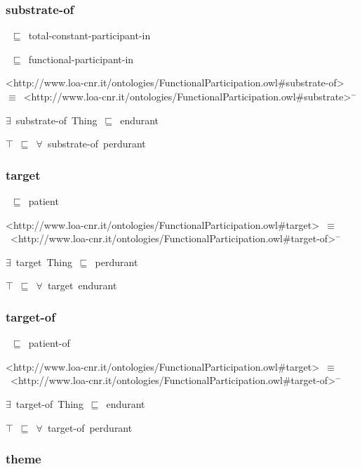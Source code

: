 \documentclass{article}
\begin{document}
\subsubsection*{substrate-of}

~\ensuremath{\sqsubseteq}~total-constant-participant-in

~\ensuremath{\sqsubseteq}~functional-participant-in

<http://www.loa-cnr.it/ontologies/FunctionalParticipation.owl#substrate-of>~\ensuremath{\equiv}~<http://www.loa-cnr.it/ontologies/FunctionalParticipation.owl#substrate>\ensuremath{^-}

\ensuremath{\exists}~substrate-of~Thing~\ensuremath{\sqsubseteq}~endurant

\ensuremath{\top}~\ensuremath{\sqsubseteq}~\ensuremath{\forall}~substrate-of~perdurant

\subsubsection*{target}

~\ensuremath{\sqsubseteq}~patient

<http://www.loa-cnr.it/ontologies/FunctionalParticipation.owl#target>~\ensuremath{\equiv}~<http://www.loa-cnr.it/ontologies/FunctionalParticipation.owl#target-of>\ensuremath{^-}

\ensuremath{\exists}~target~Thing~\ensuremath{\sqsubseteq}~perdurant

\ensuremath{\top}~\ensuremath{\sqsubseteq}~\ensuremath{\forall}~target~endurant

\subsubsection*{target-of}

~\ensuremath{\sqsubseteq}~patient-of

<http://www.loa-cnr.it/ontologies/FunctionalParticipation.owl#target>~\ensuremath{\equiv}~<http://www.loa-cnr.it/ontologies/FunctionalParticipation.owl#target-of>\ensuremath{^-}

\ensuremath{\exists}~target-of~Thing~\ensuremath{\sqsubseteq}~endurant

\ensuremath{\top}~\ensuremath{\sqsubseteq}~\ensuremath{\forall}~target-of~perdurant

\subsubsection*{theme}
\end{document}
